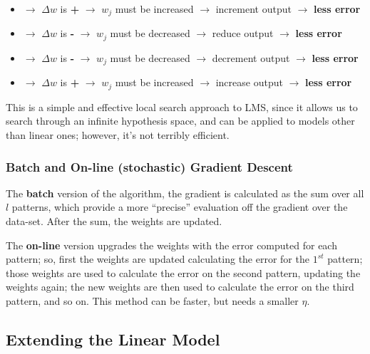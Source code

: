 \begin{itemize}
    \item {} $\rightarrow$ $\Delta w$ is \textbf{+} $\rightarrow$ $w_j$ must be increased $\rightarrow$ increment output $\rightarrow$ \textbf{less error}

    \item {} $\rightarrow$ $\Delta w$ is \textbf{-} $\rightarrow$ $w_j$ must be decreased $\rightarrow$ reduce output $\rightarrow$ \textbf{less error}

    \item {} $\rightarrow$ $\Delta w$ is \textbf{-} $\rightarrow$ $w_j$ must be decreased $\rightarrow$ decrement output $\rightarrow$ \textbf{less error}

    \item {} $\rightarrow$ $\Delta w$ is \textbf{+} $\rightarrow$ $w_j$ must be increased $\rightarrow$ increase output $\rightarrow$ \textbf{less error}
\end{itemize}

This is a simple and effective local search approach to LMS, since it allows us to search through an infinite hypothesis space, and can be applied to models other than linear ones; however, it's not terribly efficient.

\subsubsection{Batch and On-line (stochastic) Gradient Descent}
The \textbf{batch} version of the algorithm, the gradient is calculated as the sum over all $l$ patterns, which provide a more ``precise'' evaluation off the gradient over the data-set. After the sum, the weights are updated.

The \textbf{on-line} version upgrades the weights with the error computed for each pattern; so, first the weights are updated calculating the error for the $1^{st}$ pattern; those weights are used to calculate the error on the second pattern, updating the weights again; the new weights are then used to calculate the error on the third pattern, and so on. This method can be faster, but needs a smaller $\eta$.

\subsection{Extending the Linear Model}

